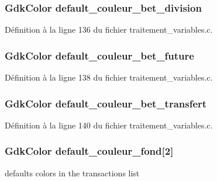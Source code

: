 \subsubsection[{default\_\-couleur\_\-bet\_\-division}]{\setlength{\rightskip}{0pt plus 5cm}GdkColor {\bf default\_\-couleur\_\-bet\_\-division}}\label{traitement__variables_8c_a8429a293f7b484c7ddd18477b5826837}


Définition à la ligne 136 du fichier traitement\_\-variables.c.

\subsubsection[{default\_\-couleur\_\-bet\_\-future}]{\setlength{\rightskip}{0pt plus 5cm}GdkColor {\bf default\_\-couleur\_\-bet\_\-future}}\label{traitement__variables_8c_adba548ffc8e18696333d5a1c307f4c16}


Définition à la ligne 138 du fichier traitement\_\-variables.c.

\subsubsection[{default\_\-couleur\_\-bet\_\-transfert}]{\setlength{\rightskip}{0pt plus 5cm}GdkColor {\bf default\_\-couleur\_\-bet\_\-transfert}}\label{traitement__variables_8c_aeb871339509ce469b886f7e5e302c85a}


Définition à la ligne 140 du fichier traitement\_\-variables.c.

\subsubsection[{default\_\-couleur\_\-fond}]{\setlength{\rightskip}{0pt plus 5cm}GdkColor {\bf default\_\-couleur\_\-fond}[2]}\label{traitement__variables_8c_a825451c26e17de125aef98ca62e96358}
defaults colors in the transactions list 


